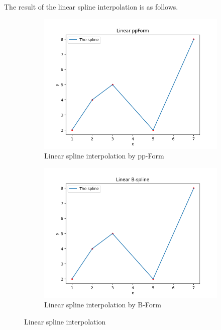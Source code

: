 \documentclass[a4paper]{article}
\begin{document}
The result of the linear spline interpolation is as follows.
\begin{figure}[htbp]
  \centering
  \begin{subfigure}[b]{0.45\textwidth}
    \includegraphics[width=\textwidth]{../figure/Linear ppForm.png}
    \caption{Linear spline interpolation by pp-Form}
  \end{subfigure}
  \begin{subfigure}[b]{0.45\textwidth}
    \includegraphics[width=\textwidth]{../figure/Linear B-spline.png}
    \caption{Linear spline interpolation by B-Form}
  \end{subfigure}
  \caption{Linear spline interpolation}
\end{figure}
\end{document}

